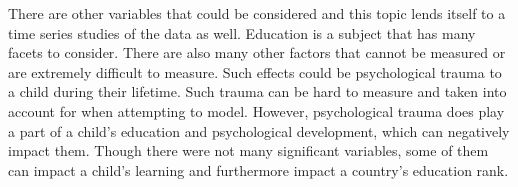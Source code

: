 \documentclass[12pt,english]{article}
\begin{document}
There are other variables that could be considered and this topic lends itself to a time series studies of the data as well. Education is a subject that has many facets to consider. There are also many other factors that cannot be measured or are extremely difficult to measure. Such effects could be psychological trauma to a child during their lifetime. Such trauma can be hard to measure and taken into account for when attempting to model. However, psychological trauma does play a part of a child's education and psychological development, which can negatively impact them. Though there were not many significant variables, some of them can impact a child’s learning and furthermore impact a country’s education rank. 
\newpage



\nocite{*}
\end{document}
